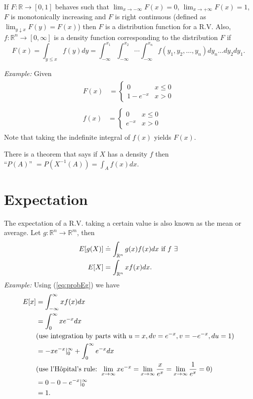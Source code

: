 \documentclass[lecture,12pt,]{pcms-l}
\begin{document}
If $F: \mathbb{R} \to [0,1]$ behaves such that $\lim_{x \to -\infty} F(x) = 0$, $\lim_{x \to +\infty} F(x) = 1$, $F$ is monotonically increasing and $F$ is right continuous (defined as $\lim_{y \downarrow x} F(y) = F(x)$) then $F$ is a distribution function for a R.V. Also, $f:\mathbb{R}^n \to [0,\infty]$ is a density function corresponding to the distribution $F$ if
$$F(x) = \int_{y \leq x} f(y)dy = \int_{-\infty}^{x_1} \int_{-\infty}^{x_2}\cdots \int_{-\infty}^{x_n} f(y_1,y_2,\ldots,y_n)dy_n\ldots dy_2dy_1.$$

\textit{Example:} Given
\begin{align}
\label{eq:probEg}
\begin{split}F(x) &= \begin{cases} 0 & x \leq 0 \\ 1-e^{-x} & x > 0 \end{cases}\end{split} \nonumber \\
\begin{split}f(x) &= \begin{cases} 0 & x \leq 0 \\ e^{-x} & x > 0 \end{cases}\end{split}
\end{align}
Note that taking the indefinite integral of $f(x)$ yields $F(x)$.

There is a theorem that says if $X$ has a density $f$ then \\
``$P(A)$'' $= P\left(X^{-1}(A)\right) = \int_A f(x)dx$.

\section{Expectation}
The expectation of a R.V. taking a certain value is also known as the mean or average. Let $g: \mathbb{R}^n \to \mathbb{R}^m$, then
\begin{align*}
E[g(X)] &\doteq \int_{\mathbb{R}^n} g(x)f(x)dx \textnormal{ if } f ~ \exists \\
E[X] &= \int_{\mathbb{R}^n}xf(x)dx.
\end{align*}
\textit{Example:} Using (\ref{eq:probEg}) we have
\begin{align*}
E[x] &= \int_{-\infty}^\infty xf(x)dx \\
&= \int_0^\infty xe^{-x}dx \\
&(\textnormal{use integration by parts with } u = x, dv = e^{-x}, v = -e^{-x}, du = 1) \\
&= -xe^{-x}\rvert_0^\infty + \int_0^\infty e^{-x}dx \\
&(\textnormal{use l'H\^opital's rule: } \lim_{x \to \infty} xe^{-x} = \lim_{x \to \infty} \frac{x}{e^x} = \lim_{x \to \infty} \frac{1}{e^x} = 0) \\
&= 0 - 0 - e^{-x}\rvert_0^\infty \\
&= 1.
\end{align*}
\end{document}
